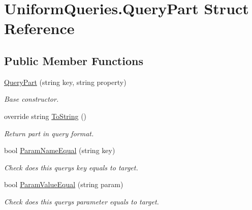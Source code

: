 \hypertarget{struct_uniform_queries_1_1_query_part}{}\section{Uniform\+Queries.\+Query\+Part Struct Reference}
\label{struct_uniform_queries_1_1_query_part}
\subsection*{Public Member Functions}
\begin{DoxyCompactItemize}
\item 
\mbox{\hyperlink{struct_uniform_queries_1_1_query_part_adabbcaa15ccf653f686d4f2bcd39ce09}{Query\+Part}} (string key, string property)
\begin{DoxyCompactList}\small\item\em Base constructor. \end{DoxyCompactList}\item 
override string \mbox{\hyperlink{struct_uniform_queries_1_1_query_part_acf5597530f693df3804fc2e638805245}{To\+String}} ()
\begin{DoxyCompactList}\small\item\em Return part in query format. \end{DoxyCompactList}\item 
bool \mbox{\hyperlink{struct_uniform_queries_1_1_query_part_af032469107805c1c71083666bb8548a9}{Param\+Name\+Equal}} (string key)
\begin{DoxyCompactList}\small\item\em Check does this query\textquotesingle{}s key equals to target. \end{DoxyCompactList}\item 
bool \mbox{\hyperlink{struct_uniform_queries_1_1_query_part_a5fb4475a72dcb6882fc860f7c0fcc50e}{Param\+Value\+Equal}} (string param)
\begin{DoxyCompactList}\small\item\em Check does this query\textquotesingle{}s parameter equals to target. \end{DoxyCompactList}\end{DoxyCompactItemize}
